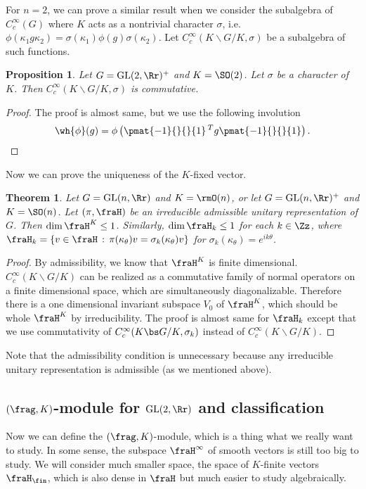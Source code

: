 \documentclass{article}
\newtheorem{theorem}{Theorem}[section]
\newcommand{\pre}[1]{\prescript{#1}{}}
\newcommand{\GL}{\mathrm{GL}}
\newtheorem{proposition}{Proposition}[section]
\begin{document}
For $n = 2$, we can prove a similar result when we consider the subalgebra of $C_{c}^{\infty}(G)$ where $K$ acts as a nontrivial character $\sigma$, i.e. $\phi(\kappa_{1} g\kappa_{2}) = \sigma(\kappa_{1}) \phi(g) \sigma(\kappa_{2})$. Let $C_{c}^{\infty}(K\backslash G/K, \sigma)$ be a subalgebra of such functions. 
\begin{proposition}
\label{commchar}
Let $G = \GL(2, \Rr)^{+}$ and $K = \SO(2)$. Let $\sigma$ be a character of $K$. Then $C_{c}^{\infty}(K\backslash G / K, \sigma)$ is commutative. 
\end{proposition}
\begin{proof}
The proof is almost same, but we use the following involution
$$
\wh{\phi}(g) = \phi\left(\pmat{-1}{}{}{1} \pre{T}{}g \pmat{-1}{}{}{1}\right). 
$$
\end{proof}

Now we can prove the uniqueness of the $K$-fixed vector. 
\begin{theorem}
\label{mult1char}
Let $G = \GL(n, \Rr)$ and $K = \rmO(n)$, or let $G = \GL(n, \Rr)^{+}$ and $K =\SO(n)$. Let $(\pi, \fraH)$ be an irreducible admissible unitary representation of $G$. Then $\dim \fraH^{K} \leq 1$. 
Similarly, $\dim \fraH_{k} \leq 1$ for each $k\in \Zz$, where $\fraH_{k} = \{v\in \fraH\,:\, \pi(\kappa_{\theta})v = \sigma_{k}(\kappa_{\theta})v\}$ for $\sigma_{k}(\kappa_{\theta}) = e^{ik\theta}$. 
\end{theorem}
\begin{proof}
By admissibility, we know that $\fraH^{K}$ is finite dimensional. $C_{c}^{\infty}(K\backslash G/K)$ can be realized as a commutative family of normal operators on a finite dimensional space, which are simultaneously diagonalizable. Therefore there is a one dimensional invariant subspace $V_{0}$ of $\fraH^{K}$, which should be whole $\fraH^{K}$ by irreducibility. 
The proof is almost same for $\fraH_{k}$ except that we use commutativity of $C_{c}^{\infty}(K\bs G/K, \sigma_{k})$ instead of $C_{c}^{\infty}(K\backslash G/K)$.
\end{proof}
Note that the admissibility condition is unnecessary because any irreducible unitary representation is admissible (as we mentioned above). 


\subsection{$(\frag, K)$-module for $\GL(2, \Rr)$ and classification}
Now we can define the $(\frag, K)$-module, which is a thing what we really want to study. In some sense, the subspace $\fraH^{\infty}$ of smooth vectors is still too big to study. We will consider much smaller space, the space of $K$-finite vectors $\fraH_{\fin}$, which is also dense in $\fraH$ but much easier to study algebraically. 
\end{document}

